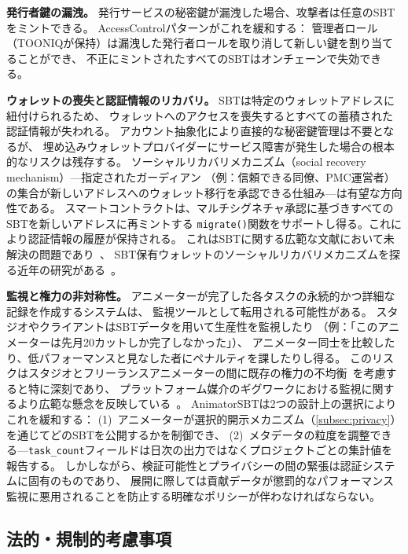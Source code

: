 \textbf{発行者鍵の漏洩。}
発行サービスの秘密鍵が漏洩した場合、攻撃者は任意のSBTをミントできる。
AccessControlパターンがこれを緩和する：
管理者ロール（TOONIQが保持）は漏洩した発行者ロールを取り消して新しい鍵を割り当てることができ、
不正にミントされたすべてのSBTはオンチェーンで失効できる。

\textbf{ウォレットの喪失と認証情報のリカバリ。}
SBTは特定のウォレットアドレスに紐付けられるため、
ウォレットへのアクセスを喪失するとすべての蓄積された認証情報が失われる。
アカウント抽象化により直接的な秘密鍵管理は不要となるが、
埋め込みウォレットプロバイダーにサービス障害が発生した場合の根本的なリスクは残存する。
ソーシャルリカバリメカニズム（social recovery mechanism）---指定されたガーディアン
（例：信頼できる同僚、PMC運営者）の集合が新しいアドレスへのウォレット移行を承認できる仕組み---は有望な方向性である。
スマートコントラクトは、マルチシグネチャ承認に基づきすべてのSBTを新しいアドレスに再ミントする
\texttt{migrate()}関数をサポートし得る。これにより認証情報の履歴が保持される。
これはSBTに関する広範な文献において未解決の問題であり~\cite{buterin2022decentralized}、
SBT保有ウォレットのソーシャルリカバリメカニズムを探る近年の研究がある~\cite{goldston2023recovery}。

\textbf{監視と権力の非対称性。}
アニメーターが完了した各タスクの永続的かつ詳細な記録を作成するシステムは、
監視ツールとして転用される可能性がある。
スタジオやクライアントはSBTデータを用いて生産性を監視したり
（例：「このアニメーターは先月20カットしか完了しなかった」）、
アニメーター同士を比較したり、低パフォーマンスと見なした者にペナルティを課したりし得る。
このリスクはスタジオとフリーランスアニメーターの間に既存の権力の不均衡~\cite{jftc2025anime}を考慮すると特に深刻であり、
プラットフォーム媒介のギグワークにおける監視に関するより広範な懸念を反映している~\cite{sannon2022privacy}。
AnimatorSBTは2つの設計上の選択によりこれを緩和する：
(1)~アニメーターが選択的開示メカニズム（\cref{subsec:privacy}）を通じてどのSBTを公開するかを制御でき、
(2)~メタデータの粒度を調整できる---\texttt{task\_count}フィールドは日次の出力ではなくプロジェクトごとの集計値を報告する。
しかしながら、検証可能性とプライバシーの間の緊張は認証システムに固有のものであり、
展開に際しては貢献データが懲罰的なパフォーマンス監視に悪用されることを防止する明確なポリシーが伴わなければならない。

\subsection{法的・規制的考慮事項}
\label{subsec:legal}

